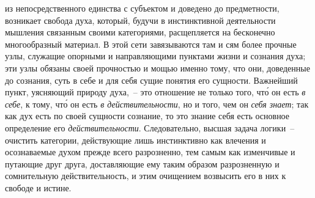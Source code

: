 из непосредственного единства с субъектом и доведено
до предметности, возникает свобода духа, который, будучи
в инстинктивной деятельности мышления связанным своими
категориями, расщепляется на бесконечно многообразный
материал. В этой сети завязываются там и сям
более прочные узлы, служащие опорными и направляющими
пунктами жизни и сознания духа; эти узлы обязаны
своей прочностью и мощью именно тому, что они, доведенные
до сознания, суть в себе и для себя сущие понятия
его сущности. Важнейший пункт, уясняющий природу
духа,~-- это отношение не только того, чт\'о он есть \emph{в себе},
к тому, чт\'о он есть \emph{в действительности}, но и того, чем он
\emph{себя знает}; так как дух есть по своей сущности сознание,
то это знание себя есть основное определение его \emph{действительности}.
Следовательно, высшая задача логики~--
очистить категории, действующие лишь инстинктивно как
влечения и осознаваемые духом прежде всего разрозненно,
тем самым как изменчивые и путающие друг друга,
доставляющие ему таким образом разрозненную и
сомнительную действительность, и этим очищением возвысить
его в них к свободе и истине.

